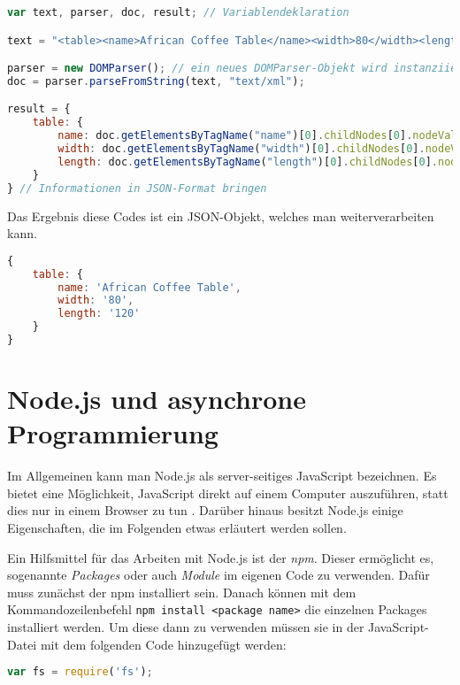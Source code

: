 \begin{lstlisting}[title=Verwendung des DOMParsers für XML, language=JavaScript]
var text, parser, doc, result; // Variablendeklaration

text = "<table><name>African Coffee Table</name><width>80</width><length>120</length></table>"; // der zu parsende Text

parser = new DOMParser(); // ein neues DOMParser-Objekt wird instanziiert
doc = parser.parseFromString(text, "text/xml");

result = {
	table: {
		name: doc.getElementsByTagName("name")[0].childNodes[0].nodeValue,
		width: doc.getElementsByTagName("width")[0].childNodes[0].nodeValue,
		length: doc.getElementsByTagName("length")[0].childNodes[0].nodeValue
	}
} // Informationen in JSON-Format bringen
\end{lstlisting}

Das Ergebnis diese Codes ist ein JSON-Objekt, welches man weiterverarbeiten kann. \\

\begin{lstlisting}[title=Ergebnis nach dem Parsen, language=JavaScript]
{
	table: {
		name: 'African Coffee Table',
		width: '80',
		length: '120'
	}
}
\end{lstlisting}



\newpage

\section{Node.js und asynchrone Programmierung}
Im Allgemeinen kann man Node.js als server-seitiges JavaScript bezeichnen. Es bietet eine Möglichkeit, JavaScript direkt auf einem Computer auszuführen, statt dies nur in einem Browser zu tun \cite{njsspec}. Darüber hinaus besitzt Node.js einige Eigenschaften, die im Folgenden etwas erläutert werden sollen.

Ein Hilfsmittel für das Arbeiten mit Node.js ist der \textit{\ac{npm}}. Dieser ermöglicht es, sogenannte \textit{Packages} oder auch \textit{Module} im eigenen Code zu verwenden. Dafür muss zunächst der \ac{npm} installiert sein. Danach können mit dem Kommandozeilenbefehl \texttt{npm install <package name>} die einzelnen Packages installiert werden. Um diese dann zu verwenden müssen sie in der JavaScript-Datei mit dem folgenden Code hinzugefügt werden: \\

\begin{lstlisting}[title=Verwendung des Filesystem-packages (fs) mit dem \texttt{require}-Befehl, language=JavaScript]
var fs = require('fs');
\end{lstlisting}

